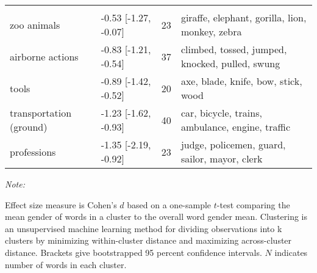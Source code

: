 \documentclass[
  english,
  ,man,floatsintext]{apa6}
\begin{document}
\begin{table}
{\begin{threeparttable}
\begin{tabular}[t]{llrl}
\addlinespace[0.3em]
\multicolumn{4}{l}{\textbf{Male-Biased Clusters}}\\
\hspace{1em}zoo animals & -0.53 [-1.27, -0.07] & 23 & giraffe, elephant, gorilla, lion, monkey, zebra\\
\hspace{1em}airborne actions & -0.83 [-1.21, -0.54] & 37 & climbed, tossed, jumped, knocked, pulled, swung\\
\hspace{1em}tools & -0.89 [-1.42, -0.52] & 20 & axe, blade, knife, bow, stick, wood\\
\hspace{1em}transportation (ground) & -1.23 [-1.62, -0.93] & 40 & car, bicycle, trains, ambulance, engine, traffic\\
\hspace{1em}professions & -1.35 [-2.19, -0.92] & 23 & judge, policemen, guard, sailor, mayor, clerk\\
\bottomrule
\end{tabular}
\begin{tablenotes}[para]
\item \textit{Note:} 
\item Effect size measure is Cohen's $d$ based on a one-sample $t$-test comparing the mean gender of words in a cluster to the overall word gender mean. Clustering is an unsupervised machine learning method for dividing observations into k clusters by minimizing within-cluster distance and maximizing across-cluster distance. Brackets give bootstrapped 95 percent confidence intervals. $N$ indicates number of words in each cluster.
\end{tablenotes}
\end{threeparttable}}
\end{table}
\end{document}
